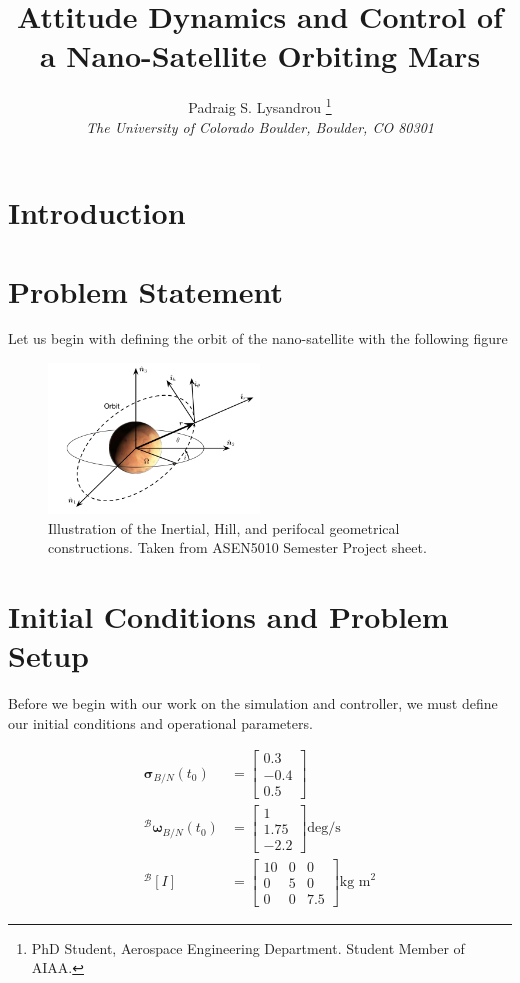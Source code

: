 \documentclass[paper]{aiaaNew}
\title{Attitude Dynamics and Control of a Nano-Satellite Orbiting Mars}
\author{Padraig S. Lysandrou
  \thanks{PhD Student, Aerospace Engineering Department.  Student Member of AIAA.}
  \\
  \emph{\normalsize The University of Colorado Boulder, Boulder, CO 80301}
}
\begin{document}
\maketitle


\clearpage
\section*{Introduction}

\section*{Problem Statement}
Let us begin with defining the orbit of the nano-satellite with the following figure


\begin{figure}[!htbp] 
  \centering
  \includegraphics[width=0.5\textwidth]{Figures/framedef.PNG}
  \caption{Illustration of the Inertial, Hill, and perifocal geometrical constructions. Taken from ASEN5010 Semester Project sheet.}
  \label{fig:succ}
 \end{figure}




\section*{Initial Conditions and Problem Setup}
Before we begin with our work on the simulation and controller, we must define our initial conditions and operational parameters.

\begin{align}
  \bm{\sigma}_{B/N}(t_0) &= \begin{bmatrix} 0.3 \\ -0.4 \\ 0.5 \end{bmatrix} \\
  ^\mathcal{B}\bm{\omega}_{B/N}(t_0) &= \begin{bmatrix} 1 \\ 1.75 \\ -2.2 \end{bmatrix} \text{deg/s} \\
  ^\mathcal{B}[I] &= 
  \begin{bmatrix}
  10 & 0 & 0 \\
  0 & 5 & 0 \\
  0 & 0 & 7.5
  \end{bmatrix} \text{kg m}^2
\end{align}
\end{document}
